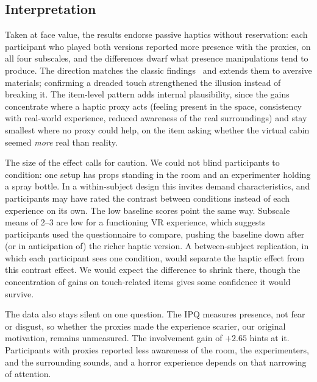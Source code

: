 
\subsection{Interpretation}
\label{sec:discussion-findings}

Taken at face value, the results endorse passive haptics without reservation: each participant who played both versions reported more presence with the proxies, on all four subscales, and the differences dwarf what presence manipulations tend to produce. The direction matches the classic findings~\cite{Hoffman.1998, Insko.2001} and extends them to aversive materials; confirming a dreaded touch strengthened the illusion instead of breaking it. The item-level pattern adds internal plausibility, since the gains concentrate where a haptic proxy acts (feeling present in the space, consistency with real-world experience, reduced awareness of the real surroundings) and stay smallest where no proxy could help, on the item asking whether the virtual cabin seemed \emph{more} real than reality.

The size of the effect calls for caution. We could not blind participants to condition: one setup has props standing in the room and an experimenter holding a spray bottle. In a within-subject design this invites demand characteristics, and participants may have rated the contrast between conditions instead of each experience on its own. The low baseline scores point the same way. Subscale means of 2--3 are low for a functioning VR experience, which suggests participants used the questionnaire to compare, pushing the baseline down after (or in anticipation of) the richer haptic version. A between-subject replication, in which each participant sees one condition, would separate the haptic effect from this contrast effect. We would expect the difference to shrink there, though the concentration of gains on touch-related items gives some confidence it would survive.

The data also stays silent on one question. The IPQ measures presence, not fear or disgust, so whether the proxies made the experience scarier, our original motivation, remains unmeasured. The involvement gain of $+2.65$ hints at it. Participants with proxies reported less awareness of the room, the experimenters, and the surrounding sounds, and a horror experience depends on that narrowing of attention.
